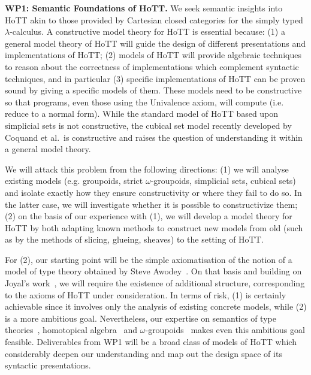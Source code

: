 \documentclass[a4paper,11pt]{article}
\begin{document}



{\bf WP1: Semantic Foundations of HoTT.}  We seek semantic insights
into HoTT akin to those provided by Cartesian closed categories for
the simply typed $\lambda$-calculus.  A constructive model theory for
HoTT is essential because: (1) a general model theory of HoTT will
guide the design of different presentations and implementations of
HoTT; (2) models of HoTT will provide algebraic techniques to reason
about the correctness of implementations which complement syntactic
techniques, and in particular (3) specific implementations of HoTT can
be proven sound by giving a specific models of them.  These models
need to be constructive so that programs, even those using the
Univalence axiom, will compute ({i.e.} reduce to a normal form). While
the standard model of HoTT based upon simplicial sets is not
constructive, the cubical set model recently developed by Coquand et
{al.}\ is constructive and raises the question of understanding it
within a general model theory.

 We will attack this problem from the following directions: (1) we
 will analyse existing models ({e.g.} groupoids, strict
 $\omega$-groupoids, simplicial sets, cubical sets) and isolate
 exactly how they ensure constructivity or where they fail to do
 so. In the latter case, we will investigate whether it is possible to
 constructivize them; (2) on the basis of our experience with (1), we
 will develop a model theory for HoTT by both adapting known methods
 to construct new models from old (such as by the methods of slicing,
 glueing, sheaves) to the setting of HoTT.

For (2), our starting point will be the simple axiomatisation of the
notion of a model of type theory obtained by Steve
Awodey~\cite{AwodeyS:natmtt}.  On that basis and building on Joyal's
work~\cite{JoyalA:cathl}, we will require the existence of additional
structure, corresponding to the axioms of HoTT under consideration. In
terms of risk, (1) is certainly achievable since it involves only the
analysis of existing concrete models, while (2) is a more ambitious
goal. Nevertheless, our expertise on semantics of type
theories~\cite{neil2014relParamDep}, homotopical
algebra~\cite{GambinoN:idetwfs,GambinoN:homl2c} and
$\omega$-groupoids~\cite{alti:csl12} makes even this ambitious goal
feasible. Deliverables from WP1 will be a broad class of models of
HoTT which considerably deepen our understanding and map out the
design space of its syntactic presentations.
\end{document}
